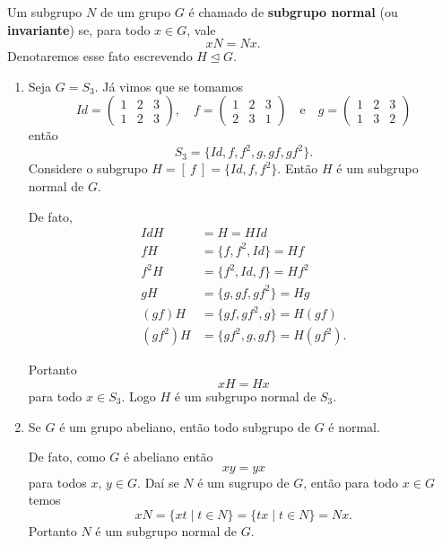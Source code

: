 \begin{definicao}
    Um subgrupo $N$ de um grupo $G$ é chamado de \textbf{subgrupo normal} (ou \textbf{invariante}) se, para todo $x \in G$, vale
    \[
        xN = Nx.
    \]
    Denotaremos esse fato escrevendo $H \unlhd G$.
\end{definicao}

\begin{exemplos}
    \begin{enumerate}[label={\arabic*})]
        \item Seja $G = S_3$. Já vimos que se tomamos
        \[
            Id = \begin{pmatrix}
                1 & 2 & 3\\
                1 & 2 & 3
            \end{pmatrix}, \quad
            f = \begin{pmatrix}
                1 & 2 & 3\\
                2 & 3 & 1
            \end{pmatrix} \quad \mbox{e}\quad
            g = \begin{pmatrix}
                1 & 2 & 3\\
                1 & 3 & 2
            \end{pmatrix}
        \]
        então
        \[
            S_3 = \{Id, f, f^2, g, gf, gf^2\}.
        \]
        Considere o subgrupo $H = [\ f\ ] = \{Id, f, f^2\}$. Então $H$ é um subgrupo normal de $G$.
        \begin{solucao}
            De fato,
            \begin{align*}
                IdH &= H = HId\\
                fH &= \{f, f^2, Id\} = Hf\\
                f^2H &= \{f^2, Id, f\} = Hf^2\\
                gH &= \{g, gf, gf^2\} = Hg\\
                (gf)H &= \{gf, gf^2, g\} = H(gf)\\
                (gf^2)H &= \{gf^2, g, gf\} = H(gf^2).
            \end{align*}

            Portanto
            \[
                xH = Hx
            \]
            para todo $x \in S_3$. Logo $H$ é um subgrupo normal de $S_3$.
        \end{solucao}

        \item Se $G$ é um grupo abeliano, então todo subgrupo de $G$ é normal.
        \begin{solucao}
            De fato, como $G$ é abeliano então
            \[
                xy = yx
            \]
            para todos $x$, $y \in G$. Daí se $N$ é um sugrupo de $G$, então para todo $x \in G$ temos
            \[
                xN = \{xt \mid t \in N\} = \{tx \mid t \in N\} = Nx.
            \]
            Portanto $N$ é um subgrupo normal de $G$.
        \end{solucao}


\end{enumerate}
\end{exemplos}
